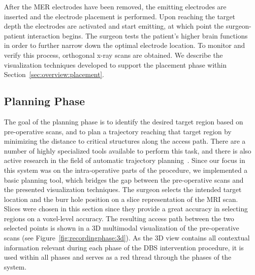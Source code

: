 \documentclass{vgtc}                          %
\begin{document}
After the MER electrodes have been removed, the emitting electrodes are inserted and the electrode placement is performed. Upon reaching the target depth the electrodes are activated and start emitting, at which point the surgeon-patient interaction begins. The surgeon tests the patient's higher brain functions in order to further narrow down the optimal electrode location. To monitor and verify this process, orthogonal x-ray scans are obtained. We describe the visualization techniques developed to support the placement phase within Section~\ref{sec:overview:placement}.


\subsection{Planning Phase}\label{sec:overview:planning}
The goal of the planning phase is to identify the desired target region based on pre-operative scans, and to plan a trajectory reaching that target region by minimizing the distance to critical structures along the access path. There are a number of highly specialized tools available to perform this task, and there is also active research in the field of automatic trajectory planning~\cite{Shamir2010}. Since our focus in this system was on the intra-operative parts of the procedure, we implemented a basic planning tool, which bridges the gap between the pre-operative scans and the presented visualization techniques. The surgeon selects the intended target location and the burr hole position on a slice representation of the MRI scan. Slices were chosen in this section since they provide a great accuracy in selecting regions on a voxel-level accuracy. The resulting access path between the two selected points is shown in a 3D multimodal visualization of the pre-operative scans (see Figure~\ref{fig:recordingphase:3d}). As the 3D view contains all contextual information relevant during each phase of the DBS intervention procedure, it is used within all phases and serves as a red thread through the phases of the system.
%
\end{document}
